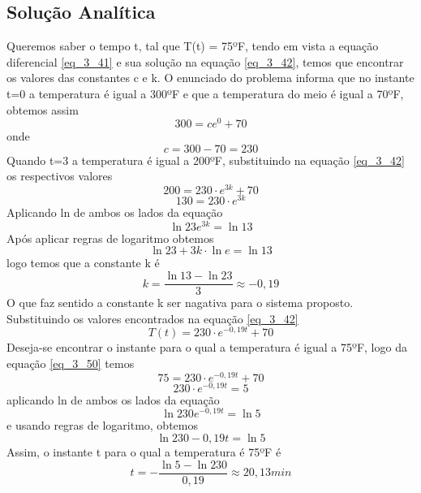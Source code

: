 \documentclass[12pt]{article}
\begin{document}
\subsection{Solução Analítica}
Queremos saber o tempo t, tal que T(t) = 75ºF, tendo em vista a equação diferencial \ref{eq_3_41} e sua solução na equação \ref{eq_3_42}, temos que encontrar os valores das constantes c e k. O enunciado do problema informa que no instante t=0 a temperatura é igual a 300ºF e que a temperatura do meio é igual a 70ºF, obtemos assim
\begin{equation}
    300 = ce^{0}+70
\label{eq_3_43}
\end{equation}
onde
\begin{equation}
    c = 300-70 = 230
\label{eq_3_44}
\end{equation}
Quando t=3 a temperatura é igual a 200ºF, substituindo na equação \ref{eq_3_42} os respectivos valores
\begin{equation}
    200 = 230 \cdot e^{3k}+70
\label{eq_3_45}
\end{equation}
\begin{equation}
    130 = 230 \cdot e^{3k}
\label{eq_3_46}
\end{equation}
Aplicando ln de ambos os lados da equação
\begin{equation}
    \ln{23e^{3k}} = \ln{13}
\label{eq_3_47}
\end{equation}
Após aplicar regras de logaritmo obtemos
\begin{equation}
    \ln{23}+3k \cdot \ln{e} = \ln{13}
\label{eq_3_48}
\end{equation}
logo temos que a constante k é
\begin{equation}
    k = \frac{\ln{13} - \ln{23}}{3} \approx -0,19
\label{eq_3_49}
\end{equation}
O que faz sentido a constante k ser nagativa para o sistema proposto. Substituindo os valores encontrados na equação \ref{eq_3_42}
\begin{equation}
    T(t) = 230 \cdot e^{-0,19t} + 70
\label{eq_3_50}
\end{equation}
Deseja-se encontrar o instante para o qual a temperatura é igual a 75ºF, logo da equação \ref{eq_3_50} temos
\begin{equation}
    75 = 230 \cdot e^{-0,19t} + 70
\label{eq_3_51}
\end{equation}
\begin{equation}
    230 \cdot e^{-0,19t} = 5
\label{eq_3_52}
\end{equation}
aplicando ln de ambos os lados da equação 
\begin{equation}
    \ln{230e^{-0,19t}} = \ln{5}
\label{eq_3_53}
\end{equation}
e usando regras de logaritmo, obtemos
\begin{equation}
    \ln{230} - 0,19t = \ln{5}
\label{eq_3_54}
\end{equation}
Assim, o instante t para o qual a temperatura é 75ºF é
\begin{equation}
    t = -\frac{\ln{5} - \ln{230}}{0,19} \approx 20,13min
\end{equation}{}
\end{document}

